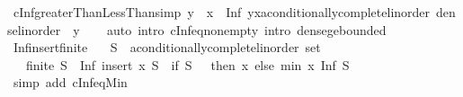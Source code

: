 \begin{isabellebody}
\endisatagproof
{\isafoldproof}%
%
\isadelimproof
\isanewline
%
\endisadelimproof
\isanewline
{}\isamarkupfalse%
\ cInf{\isacharunderscore}{\kern0pt}greaterThanLessThan{\isacharbrackleft}{\kern0pt}simp{\isacharbrackright}{\kern0pt}{\isacharcolon}{\kern0pt}\ {\isachardoublequoteopen}y\ {\isacharless}{\kern0pt}\ x\ {\isasymLongrightarrow}\ Inf\ {\isacharbraceleft}{\kern0pt}y{\isacharless}{\kern0pt}{\isachardot}{\kern0pt}{\isachardot}{\kern0pt}{\isacharless}{\kern0pt}x{\isacharcolon}{\kern0pt}{\isacharcolon}{\kern0pt}{\isacharprime}{\kern0pt}a{\isacharcolon}{\kern0pt}{\isacharcolon}{\kern0pt}{\isacharbraceleft}{\kern0pt}conditionally{\isacharunderscore}{\kern0pt}complete{\isacharunderscore}{\kern0pt}linorder{\isacharcomma}{\kern0pt}\ dense{\isacharunderscore}{\kern0pt}linorder{\isacharbraceright}{\kern0pt}{\isacharbraceright}{\kern0pt}\ {\isacharequal}{\kern0pt}\ y{\isachardoublequoteclose}\isanewline
%
\isadelimproof
\ \ %
\endisadelimproof
%
\isatagproof
{}\isamarkupfalse%
\ {\isacharparenleft}{\kern0pt}auto\ intro{\isacharbang}{\kern0pt}{\isacharcolon}{\kern0pt}\ cInf{\isacharunderscore}{\kern0pt}eq{\isacharunderscore}{\kern0pt}non{\isacharunderscore}{\kern0pt}empty\ intro{\isacharcolon}{\kern0pt}\ dense{\isacharunderscore}{\kern0pt}ge{\isacharunderscore}{\kern0pt}bounded{\isacharparenright}{\kern0pt}%
\endisatagproof
{\isafoldproof}%
%
\isadelimproof
\isanewline
%
\endisadelimproof
\isanewline
{}\isamarkupfalse%
\ Inf{\isacharunderscore}{\kern0pt}insert{\isacharunderscore}{\kern0pt}finite{\isacharcolon}{\kern0pt}\isanewline
\ \ \ S\ {\isacharcolon}{\kern0pt}{\isacharcolon}{\kern0pt}\ {\isachardoublequoteopen}{\isacharprime}{\kern0pt}a{\isacharcolon}{\kern0pt}{\isacharcolon}{\kern0pt}conditionally{\isacharunderscore}{\kern0pt}complete{\isacharunderscore}{\kern0pt}linorder\ set{\isachardoublequoteclose}\isanewline
\ \ \ {\isachardoublequoteopen}finite\ S\ {\isasymLongrightarrow}\ Inf\ {\isacharparenleft}{\kern0pt}insert\ x\ S{\isacharparenright}{\kern0pt}\ {\isacharequal}{\kern0pt}\ {\isacharparenleft}{\kern0pt}if\ S\ {\isacharequal}{\kern0pt}\ {\isacharbraceleft}{\kern0pt}{\isacharbraceright}{\kern0pt}\ then\ x\ else\ min\ x\ {\isacharparenleft}{\kern0pt}Inf\ S{\isacharparenright}{\kern0pt}{\isacharparenright}{\kern0pt}{\isachardoublequoteclose}\isanewline
%
\isadelimproof
\ \ %
\endisadelimproof
%
\isatagproof
{}\isamarkupfalse%
\ {\isacharparenleft}{\kern0pt}simp\ add{\isacharcolon}{\kern0pt}\ cInf{\isacharunderscore}{\kern0pt}eq{\isacharunderscore}{\kern0pt}Min{\isacharparenright}{\kern0pt}%

\end{isabellebody}
